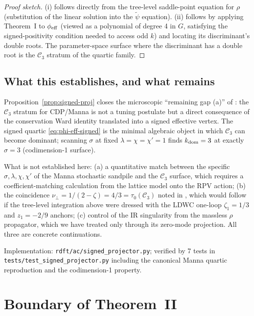 \documentclass[11pt,a4paper]{article}
\theoremstyle{plain}
\theoremstyle{definition}
\begin{document}
\begin{proof}[Proof sketch]
(i) follows directly from the tree-level saddle-point equation for
$\rho$ (substitution of the linear solution into the $\tilde\psi$
equation).  (ii) follows by applying Theorem~I to $\phi_{\rm eff}$
(viewed as a polynomial of degree 4 in $G$, satisfying the signed-positivity
condition needed to access odd $k$) and locating its discriminant's
double roots.  The parameter-space surface where the discriminant has
a double root is the $\mathcal{C}_3$ stratum of the quartic family.
\end{proof}

\subsection{What this establishes, and what remains}

Proposition~\ref{prop:signed-proj} closes the microscopic
``remaining gap (a)'' of \citep[\S 4]{AmarteifioManna2026}: the
$\mathcal{C}_3$ stratum for CDP/Manna is not a tuning postulate but
a direct consequence of the conservation Ward identity translated
into a signed effective vertex.  The signed quartic
\eqref{eq:phi-eff-signed} is the minimal algebraic object in which
$\mathcal{C}_3$ can become dominant; scanning $\sigma$ at fixed
$\lambda = \chi = \chi' = 1$ finds $k_{\rm dom} = 3$ at exactly
$\sigma = 3$ (codimension-1 surface).

What is not established here: (a) a quantitative match between the
specific $\sigma, \lambda, \chi, \chi'$ of the Manna stochastic
sandpile and the $\mathcal{C}_3$ surface, which requires a
coefficient-matching calculation from the lattice model onto the RPV
action; (b) the coincidence $\nu_\perp = 1/(2-\zeta) = 4/3 =
\tau_0(\mathcal{C}_3)$ noted in \citep{AmarteifioManna2026}, which
would follow if the tree-level integration above were dressed with
the LDWC one-loop $\zeta_1 = 1/3$ and $z_1 = -2/9$ anchors;
(c) control of the IR singularity from the massless $\rho$
propagator, which we have treated only through its zero-mode
projection.  All three are concrete continuations.

Implementation: \texttt{rdft/ac/signed\_projector.py}; verified by
7 tests in \texttt{tests/test\_signed\_projector.py} including the
canonical Manna quartic reproduction and the codimension-1
property.

\section{Boundary of Theorem~II}
\label{sec:boundary}
\end{document}
